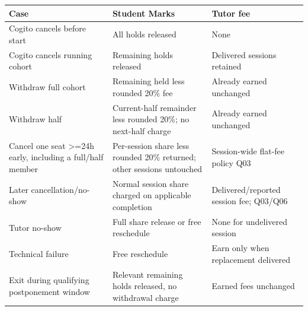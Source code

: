 \documentclass[11pt,a4paper]{article}
\newcounter{none}
\begin{document}
{\def\LTcaptype{none} %
\begin{longtable}[]{@{}
  >{\raggedright\arraybackslash}p{}
  >{\raggedright\arraybackslash}p{}
  >{\raggedright\arraybackslash}p{}@{}}
\toprule\noalign{}
\begin{minipage}[b]{\linewidth}\raggedright
Case
\end{minipage} & \begin{minipage}[b]{\linewidth}\raggedright
Student Marks
\end{minipage} & \begin{minipage}[b]{\linewidth}\raggedright
Tutor fee
\end{minipage} \\
\midrule\noalign{}
\endhead
\bottomrule\noalign{}
\endlastfoot
Cogito cancels before start & All holds released & None \\
Cogito cancels running cohort & Remaining holds released & Delivered sessions retained \\
Withdraw full cohort & Remaining held less rounded 20\% fee & Already earned unchanged \\
Withdraw half & Current-half remainder less rounded 20\%; no next-half charge & Already earned unchanged \\
Cancel one seat \textgreater=24h early, including a full/half member & Per-session share less rounded 20\% returned; other sessions untouched & Session-wide flat-fee policy Q03 \\
Later cancellation/no-show & Normal session share charged on applicable completion & Delivered/reported session fee; Q03/Q06 \\
Tutor no-show & Full share release or free reschedule & None for undelivered session \\
Technical failure & Free reschedule & Earn only when replacement delivered \\
Exit during qualifying postponement window & Relevant remaining holds released, no withdrawal charge & Earned fees unchanged \\
\end{longtable}
}
\end{document}
